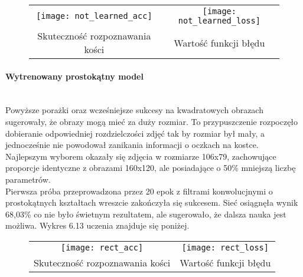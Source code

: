 \begin{figure}[h!]
\begin{center}
\begin{tabular}{cc}
\texttt{[image: not\_learned\_acc]} &
\texttt{[image: not\_learned\_loss]} \\
 Skuteczność rozpoznawania kości & Wartość funkcji błędu\\
\end{tabular}
\label{fig:not_learned}
\end{center}
\end{figure}

\paragraph{Wytrenowany prostokątny model} \mbox{}\\
Powyższe porażki oraz wcześniejsze sukcesy na kwadratowych obrazach sugerowały, że
obrazy mogą mieć za duży rozmiar. To przypuszczenie rozpoczęło dobieranie
odpowiedniej rozdzielczości zdjęć tak by rozmiar był mały, a jednocześnie nie powodował
zanikania informacji o oczkach na kostce. Najlepszym wyborem okazały się zdjęcia w rozmiarze 106x79,
zachowujące proporcje identyczne z obrazami 160x120, ale posiadające o 50\% mniejszą liczbę parametrów.\\
Pierwsza próba przeprowadzona przez 20 epok z filtrami konwolucjnymi o prostokątnych
kształtach wreszcie zakończyła się sukcesem. Sieć osiągnęła wynik 68,03\% co nie
było świetnym rezultatem, ale sugerowało, że dalsza nauka jest możliwa. Wykres 6.13 uczenia znajduje się poniżej.\\

\begin{figure}[h!]
\begin{center}
\begin{tabular}{cc}
\texttt{[image: rect\_acc]} &
\texttt{[image: rect\_loss]} \\
 Skuteczność rozpoznawania kości & Wartość funkcji błędu\\
\end{tabular}
\label{fig:rect_learned}
\end{center}
\end{figure}

